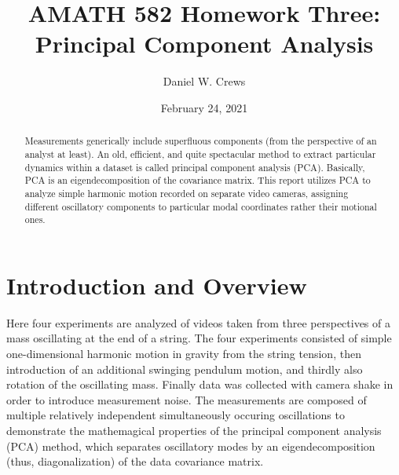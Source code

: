 \documentclass{article}
\title{AMATH 582 Homework Three: Principal Component Analysis}
\author{Daniel W. Crews}
\date{February 24, 2021}
\begin{document}
\maketitle

\begin{abstract}
  Measurements generically include superfluous components (from the perspective of an analyst at least). An old, efficient, and quite spectacular method to extract particular dynamics within a dataset is called principal component analysis (PCA). Basically, PCA is an eigendecomposition of the covariance matrix. This report utilizes PCA to analyze simple harmonic motion recorded on separate video cameras, assigning different oscillatory components to particular modal coordinates rather their motional ones. %
\end{abstract}

\section{Introduction and Overview}
Here four experiments are analyzed of videos taken from three perspectives of a mass oscillating at the end of a string. The four experiments consisted of simple one-dimensional harmonic motion in gravity from the string tension, then introduction of an additional swinging pendulum motion, and thirdly also rotation of the oscillating mass. Finally data was collected with camera shake in order to introduce measurement noise. The measurements are composed of multiple relatively independent simultaneously occuring oscillations to demonstrate the mathemagical properties of the principal component analysis (PCA) method, which separates oscillatory modes by an eigendecomposition (thus, diagonalization) of the data covariance matrix.
\end{document}

